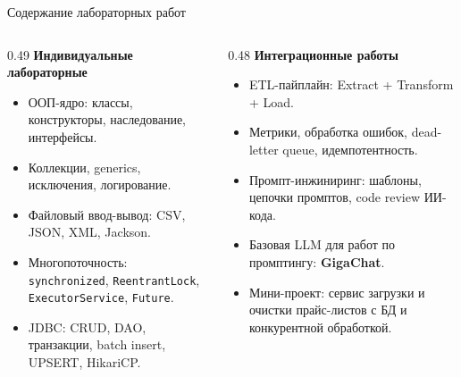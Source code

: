 \documentclass[aspectratio=169,10pt]{beamer}
\begin{document}
\begin{frame}{Содержание лабораторных работ}
\small
\begin{columns}[T,onlytextwidth]
\begin{column}{0.49\textwidth}
\textbf{Индивидуальные лабораторные}
\begin{itemize}
  \item ООП-ядро: классы, конструкторы, наследование, интерфейсы.
  \item Коллекции, generics, исключения, логирование.
  \item Файловый ввод-вывод: CSV, JSON, XML, Jackson.
  \item Многопоточность: \texttt{synchronized}, \texttt{ReentrantLock}, \texttt{ExecutorService}, \texttt{Future}.
  \item JDBC: CRUD, DAO, транзакции, batch insert, UPSERT, HikariCP.
\end{itemize}
\end{column}
\begin{column}{0.48\textwidth}
\textbf{Интеграционные работы}
\begin{itemize}
  \item ETL-пайплайн: Extract + Transform + Load.
  \item Метрики, обработка ошибок, dead-letter queue, идемпотентность.
  \item Промпт-инжиниринг: шаблоны, цепочки промптов, code review ИИ-кода.
  \item Базовая LLM для работ по промптингу: \textbf{GigaChat}.
  \item Мини-проект: сервис загрузки и очистки прайс-листов с БД и конкурентной обработкой.
\end{itemize}
\end{column}
\end{columns}
\end{frame}
\end{document}
